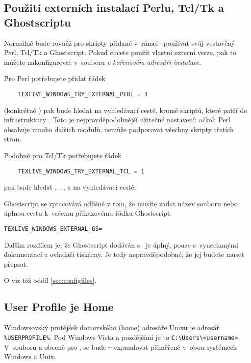 \documentclass[\classoptions,slovak,english,czech]{\classname}
\begin{document}
\subsection{Použití externích instalací Perlu, Tcl/Tk a Ghostscriptu}
\label{sec:externalwndws}

Normálně bude \TL{} rovněž pro skripty přidané v~rámci \TL\ používat svůj vestavěný Perl, Tcl/Tk a Ghostscript. Pokud chcete použít vlastní externí
verze, pak to můžete nakonfigurovat v~souboru  \emph{v kořenovém adresáři instalace}.

Pro Perl potřebujete přidat řádek 
\begin{verbatim}
	TEXLIVE_WINDOWS_TRY_EXTERNAL_PERL = 1
\end{verbatim}
\TL{} (konkrétně ) pak bude hledat  na vyhledávací cestě, kromě skriptů, které patří
do infrastruktury \TL{}. Toto je nejpravděpodobnější užitečné nastavení; ačkoli \TL{} Perl obsahuje mnoho dalších
modulů, nemůže podporovat všechny skripty třetích stran. 

Podobně pro Tcl/Tk potřebujete řádek
\begin{verbatim}
	TEXLIVE_WINDOWS_TRY_EXTERNAL_TCL = 1
\end{verbatim}
\TL{} pak bude hledat , ,
,  a  na vyhledávací cestě.

Ghostscript se zpracovává odlišně v tom, že musíte zadat
název souboru nebo úplnou cestu k~vašemu příkazovému řádku Ghostscript:
\begin{alltt}
	TEXLIVE_WINDOWS_EXTERNAL_GS = 
\end{alltt}
Dalším rozdílem je, že Ghostscript dodáván s \TL\
je úplný, pouze s~vynechanými dokumentací a ovladači tiskárny. Je tedy nepravděpodobné, že jej budete muset přepsat.

O  viz též oddíl \ref{sec:configfiles}.

\subsection{User Profile je Home}
\label{sec:winhome}
Windowsovský protějšek domovského (home) adresáře Unixu je adresář \verb|%USERPROFILE%|.
Pod Windows Vista a pozdějšími je to \verb|C:\Users\<username>|.
V~souboru \filename{texmf.cnf} a obecně pro \KPS{}, se bude \verb|~| expandovat
přiměřeně v~obou systémech Windows a Unix.
\end{document}
